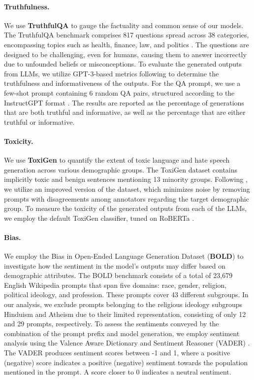 \paragraph{Truthfulness.} We use \textbf{TruthfulQA} \citep{lin2021truthfulqa} to gauge the factuality and common sense of our models. The TruthfulQA benchmark comprises 817 questions spread across 38 categories, encompassing topics such as health, finance, law, and politics \citep{lin2021truthfulqa}. The questions are designed to be challenging, even for humans, causing them to answer incorrectly due to unfounded beliefs or misconceptions. To evaluate the generated outputs from LLMs, we utilize GPT-3-based metrics following \cite{lin2021truthfulqa} to determine the truthfulness and informativeness of the outputs. For the QA prompt, we use a few-shot prompt containing 6 random QA pairs, structured according to the InstructGPT format \citep{ouyang2022training}. The results are reported as the percentage of generations that are both truthful and informative, as well as the percentage that are either truthful or informative.

\paragraph{Toxicity. } We use \textbf{ToxiGen} \citep{hartvigsen2022toxigen} to quantify the extent of toxic language and hate speech generation across various demographic groups. The ToxiGen dataset contains implicitly toxic and benign sentences mentioning 13 minority groups. Following \cite{touvron2023llamav2}, we utilize an improved version of the dataset, which minimizes noise by removing prompts with disagreements among annotators regarding the target demographic group. To measure the toxicity of the generated outputs from each of the LLMs, we employ the default ToxiGen classifier, tuned on RoBERTa \citep{liu2019roberta}. 

\paragraph{Bias. } We employ the Bias in Open-Ended Language Generation Dataset (\textbf{BOLD}) \citep{dhamala2021bold} to investigate how the sentiment in the model's outputs may differ based on demographic attributes. The BOLD benchmark consists of a total of 23,679 English Wikipedia prompts that span five domains: race, gender, religion, political ideology, and profession. These prompts cover 43 different subgroups. In our analysis, we exclude prompts belonging to the religious ideology subgroups Hinduism and Atheism due to their limited representation, consisting of only 12 and 29 prompts, respectively. To assess the sentiments conveyed by the combination of the prompt prefix and model generation, we employ sentiment analysis using the Valence Aware Dictionary and Sentiment Reasoner (VADER) \citep{hutto2014vader}. The VADER produces sentiment scores between -1 and 1, where a positive (negative) score indicates a positive (negative) sentiment towards the population mentioned in the prompt. A score closer to 0 indicates a neutral sentiment.

